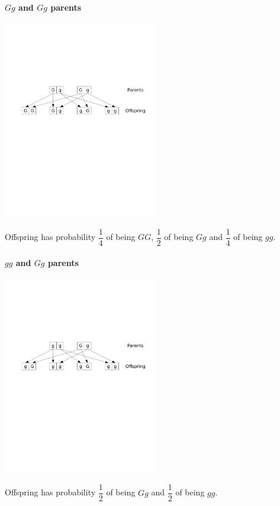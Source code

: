 \paragraph{$Gg$ and $Gg$ parents}
\begin{center}
\includegraphics[width=0.5\textwidth]
{../figs_08_genetics/hybrid_hybrid}
\end{center}
\vskip0.2cm
Offspring has probability $\dfrac 14$ of being $GG$, $\dfrac 12$ of being $Gg$ and $\dfrac 14$ of being $gg$.


\paragraph{$gg$ and $Gg$ parents}
\begin{center}
\includegraphics[width=0.5\textwidth]
{../figs_08_genetics/recessive_hybrid}
\end{center}
\vskip0.2cm
Offspring has probability $\dfrac 12$ of being $Gg$ and $\dfrac 12$ of being $gg$.


